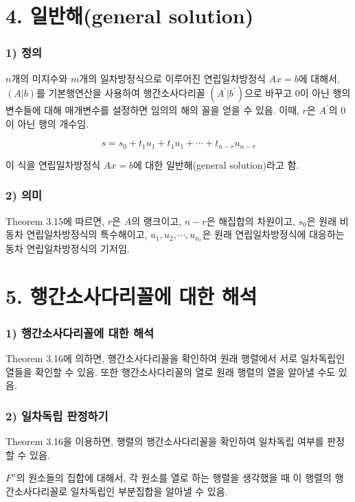 \section*{4. 일반해(general solution)}
\subsubsection*{1) 정의\\}
\begin{DEF}
$n$개의 미지수와 $m$개의 일차방정식으로 이루어진 연립일차방정식 $Ax=b$에 대해서, $(A|b)$를 기본행연산을 사용하여 행간소사다리꼴 $(A^{\prime}|b^{\prime})$으로 바꾸고 0이 아닌 행의 변수들에 대해 매개변수를 설정하면 임의의 해의 꼴을 얻을 수 있음. 이때, $r$은 $A^{\prime}$의 0이 아닌 행의 개수임.

\[
s=s_0+t_1u_1+t_1u_1+ \cdots + t_{n-r}u_{n-r}
\]

이 식을 연립일차방정식 $Ax=b$에 대한 일반해(general solution)라고 함.
\end{DEF}

\subsubsection*{2) 의미}
Theorem 3.15에 따르면, $r$은 $A$의 랭크이고, $n-r$은 해집합의 차원이고, $s_0$은 원래 비동차 연립일차방정식의 특수해이고, $u_1,u_2, \cdots ,u_{n_r}$은 원래 연립일차방정식에 대응하는 동차 연립일차방정식의 기저임.\\


\section*{5. 행간소사다리꼴에 대한 해석}
\subsubsection*{1) 행간소사다리꼴에 대한 해석}
Theorem 3.16에 의하면, 행간소사다리꼴을 확인하여 원래 행렬에서 서로 일차독립인 열들을 확인할 수 있음. 또한 행간소사다리꼴의 열로 원래 행렬의 열을 알아낼 수도 있음.

\subsubsection*{2) 일차독립 판정하기}
Theorem 3.16을 이용하면, 행렬의 행간소사다리꼴을 확인하여 일차독립 여부를 판정할 수 있음.

$F^n$의 원소들의 집합에 대해서, 각 원소를 열로 하는 행렬을 생각했을 때 이 행렬의 행간소사다리꼴로 일차독립인 부분집합을 알아낼 수 있음.

